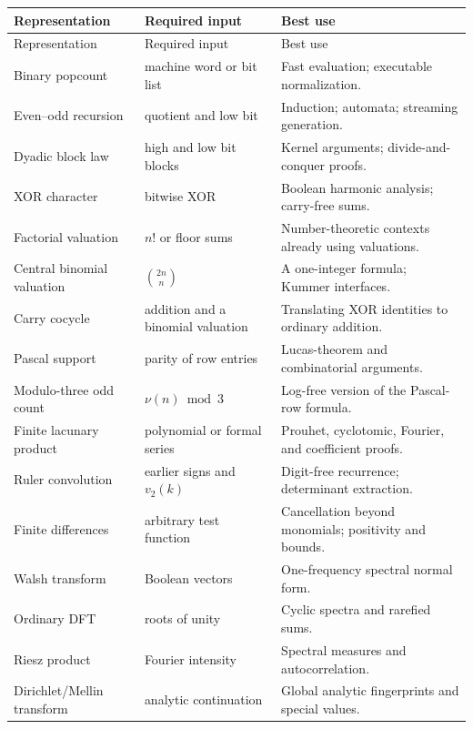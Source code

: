 \documentclass[11pt,oneside]{article}
\theoremstyle{definition}
\theoremstyle{remark}
\begin{document}
\renewcommand{\arraystretch}{1.16}
\begin{longtable}{@{}p{}p{}p{}@{}}
\toprule
Representation & Required input & Best use \\
\midrule
\endfirsthead
\toprule
Representation & Required input & Best use \\
\midrule
\endhead
Binary popcount & machine word or bit list & Fast evaluation; executable normalization. \\
Even--odd recursion & quotient and low bit & Induction; automata; streaming generation. \\
Dyadic block law & high and low bit blocks & Kernel arguments; divide-and-conquer proofs. \\
XOR character & bitwise XOR & Boolean harmonic analysis; carry-free sums. \\
Factorial valuation & \(n!\) or floor sums & Number-theoretic contexts already using valuations. \\
Central binomial valuation & \(\binom{2n}{n}\) & A one-integer formula; Kummer interfaces. \\
Carry cocycle & addition and a binomial valuation & Translating XOR identities to ordinary addition. \\
Pascal support & parity of row entries & Lucas-theorem and combinatorial arguments. \\
Modulo-three odd count & \(\nu(n)\bmod3\) & Log-free version of the Pascal-row formula. \\
Finite lacunary product & polynomial or formal series & Prouhet, cyclotomic, Fourier, and coefficient proofs. \\
Ruler convolution & earlier signs and \(v_2(k)\) & Digit-free recurrence; determinant extraction. \\
Finite differences & arbitrary test function & Cancellation beyond monomials; positivity and bounds. \\
Walsh transform & Boolean vectors & One-frequency spectral normal form. \\
Ordinary DFT & roots of unity & Cyclic spectra and rarefied sums. \\
Riesz product & Fourier intensity & Spectral measures and autocorrelation. \\
Dirichlet/Mellin transform & analytic continuation & Global analytic fingerprints and special values. \\
\bottomrule
\end{longtable}
\renewcommand{\arraystretch}{1}
\end{document}
